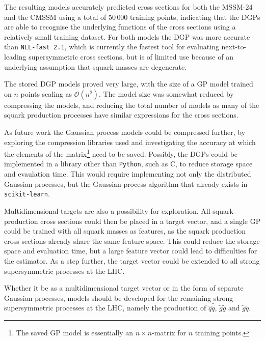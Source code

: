 \documentclass[twoside,english]{uiofysmaster}
\newcommand\CC{C\nolinebreak[4]\hspace{-.05em}\raisebox{.4ex}{\relsize{-3}{\textbf{++}}}\;}
\begin{document}
{{The resulting models accurately predicted cross sections for both the MSSM-24 and the CMSSM using a total of $50\,000$ training points, indicating that the DGPs are able to recognise the underlying functions of the cross sections using a relatively small training dataset. For both models the DGP was more accurate than \verb|NLL-fast 2.1|, which is currently the fastest tool for evaluating next-to-leading supersymmetric cross sections, but is of limited use because of an underlying assumption that squark masses are degenerate. 

The stored DGP models proved very large, with the size of a GP model trained on $n$ points scaling as $\mathcal{O}(n^2)$. The model size was somewhat reduced by compressing the models, and reducing the total number of models as many of the squark production processes have similar expressions for the cross sections. 

As future work the Gaussian process models could be compressed further, by exploring the compression libraries used and investigating the accuracy at which the elements of the matrix\footnote{The saved GP model is essentially an $n \times n$-matrix for $n$ training points.} need to be saved. Possibly, the DGPs could be implemented in a library other than \verb|Python|, such as \CC, to reduce storage space and evaulation time. This would require implementing not only the distributed Gaussian processes, but the Gaussian process algorithm that already exists in \verb|scikit-learn|.

Multidimensional targets are also a possibility for exploration. All squark production cross sections could then be placed in a target vector, and a single GP could be trained with all squark masses as features, as the squark production cross sections already share the same feature space. This could reduce the storage space and evaluation time, but a large feature vector could lead to difficulties for the estimator. As a step further, the target vector could be extended to all strong supersymmetric processes at the LHC. 

Whether it be as a multidimensional target vector or in the form of separate Gaussian processes, models should be developed for the remaining strong supersymmetric processes at the LHC, namely the production of $\tilde{q} \bar{\tilde{q}}$, $\tilde{g} \tilde{g}$ and $\tilde{g} \tilde{q}$.



\begin{appendices}



\end{appendices}}}
\end{document}
